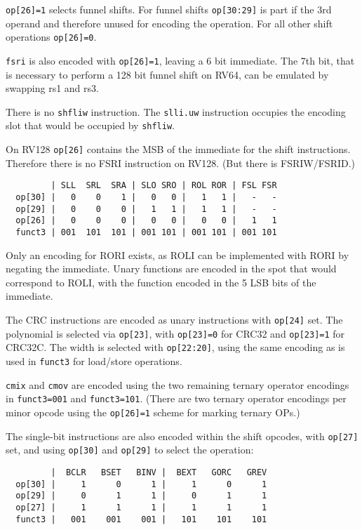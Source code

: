 {\tt op[26]=1} selects funnel shifts. For funnel shifts {\tt op[30:29]} is part
if the 3rd operand and therefore unused for encoding the operation. For all other
shift operations {\tt op[26]=0}.

{\tt fsri} is also encoded with {\tt op[26]=1}, leaving a 6 bit immediate. The 7th
bit, that is necessary to perform a 128 bit funnel shift on RV64, can be
emulated by swapping rs1 and rs3.

There is no {\tt shfliw} instruction. The {\tt slli.uw} instruction occupies
the encoding slot that would be occupied by {\tt shfliw}.

On RV128 {\tt op[26]} contains the MSB of the immediate for the shift instructions.
Therefore there is no FSRI instruction on RV128. (But there is FSRIW/FSRID.)

\begin{minipage}{\linewidth}
\begin{verbatim}
         | SLL  SRL  SRA | SLO SRO | ROL ROR | FSL FSR
  op[30] |   0    0    1 |   0   0 |   1   1 |   -   -
  op[29] |   0    0    0 |   1   1 |   1   1 |   -   -
  op[26] |   0    0    0 |   0   0 |   0   0 |   1   1
  funct3 | 001  101  101 | 001 101 | 001 101 | 001 101
\end{verbatim}
\end{minipage}

Only an encoding for RORI exists, as ROLI can be implemented with RORI by negating
the immediate. Unary functions are encoded in the spot that would correspond to ROLI,
with the function encoded in the 5 LSB bits of the immediate.

The CRC instructions are encoded as unary instructions with {\tt op[24]} set. The
polynomial is selected via {\tt op[23]}, with {\tt op[23]=0} for CRC32 and
{\tt op[23]=1} for CRC32C. The width is selected with {\tt op[22:20]}, using
the same encoding as is used in {\tt funct3} for load/store operations.

{\tt cmix} and {\tt cmov} are encoded using the two remaining ternary operator
encodings in {\tt funct3=001} and {\tt funct3=101}. (There are two ternary
operator encodings per minor opcode using the {\tt op[26]=1} scheme for
marking ternary OPs.)

The single-bit instructions are also encoded within the shift opcodes, with
{\tt op[27]} set, and using {\tt op[30]} and {\tt op[29]} to select the operation:

\begin{minipage}{\linewidth}
\begin{verbatim}
         |  BCLR   BSET   BINV |  BEXT   GORC   GREV
  op[30] |     1      0      1 |     1      0      1
  op[29] |     0      1      1 |     0      1      1
  op[27] |     1      1      1 |     1      1      1
  funct3 |   001    001    001 |   101    101    101
\end{verbatim}
\end{minipage}

